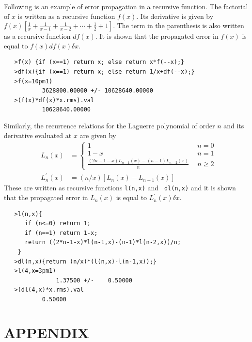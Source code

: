 \documentclass[12pt]{article}
\begin{document}
Following is an example of error propagation in a recursive function.
The factorial of $x$ is written as a recursive function $f(x)$.  Its
derivative is given by 
$f(x)\left[\frac{1}{x} + \frac{1}{x-1} + \frac{1}{x-2} +\cdots +
\frac{1}{2} + 1\right]$.  The term in the parenthesis is also written
as a recursive function $df(x)$.  It is shown that the propagated
error in $f(x)$ is equal to $f(x)df(x)\delta x$.
\begin{verbatim}
   >f(x) {if (x==1) return x; else return x*f(--x);}
   >df(x){if (x==1) return x; else return 1/x+df(--x);}
   >f(x=10pm1)
           3628800.00000 +/- 10628640.00000
   >(f(x)*df(x)*x.rms).val
           10628640.00000
\end{verbatim}
Similarly, the recurrence relations for the Laguerre polynomial of
order $n$ and its derivative evaluated at $x$ are given by
\begin{eqnarray}
&L_n(x)& = \left\{
	\begin{array}{lr}
	1&~~n=0\\
	1-x&~~n=1\\
	\frac{\left(2n-1-x\right)L_{n-1}(x)-\left(n-1\right)L_{n-2}(x)}{n}&~~n\ge2
	\end{array}
	\right. \\
&L^\prime_n(x)&  = \left(n/x\right)\left[L_n(x) - L_{n-1}(x)\right]
\end{eqnarray}
These are written as recursive functions {\tt l(n,x)} and {\tt
dl(n,x)} and it is shown that the propagated error in $L_n(x)$ is
equal to $L^\prime_n(x)\delta x$.
\begin{verbatim}
   >l(n,x){
      if (n<=0) return 1;
      if (n==1) return 1-x;
      return ((2*n-1-x)*l(n-1,x)-(n-1)*l(n-2,x))/n;
    }
   >dl(n,x){return (n/x)*(l(n,x)-l(n-1,x));}
   >l(4,x=3pm1)
               1.37500 +/-    0.50000
   >(dl(4,x)*x.rms).val
           0.50000
\end{verbatim}

\appendix       
\section*{APPENDIX}
\end{document}
